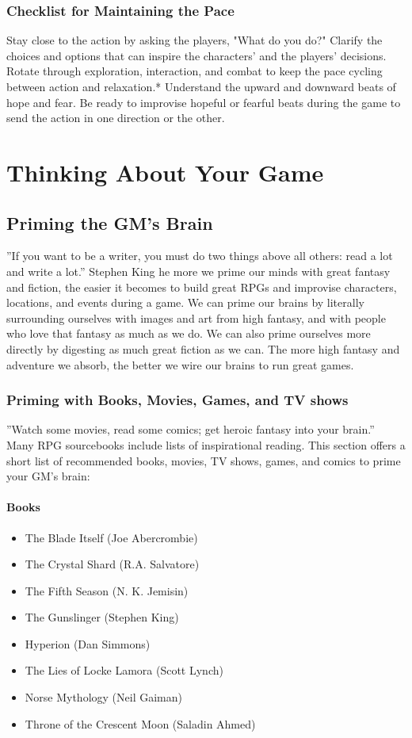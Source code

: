 \documentclass[10pt,a4paper,twoside,bg=print,twocolumn,openany,nodeprecatedcode]{dndbook}
\begin{document}
\subsection{Checklist for Maintaining the Pace}
Stay close to the action by asking the players, "What do you do?"
Clarify the choices and options that can inspire the characters' and the players' decisions.
Rotate through exploration, interaction, and combat to keep the pace cycling between action and relaxation.* Understand the upward and downward beats of hope and fear.
Be ready to improvise hopeful or fearful beats during the game to send the action in one direction or the other.
\chapter{Thinking About Your Game}
\section{Priming the GM's Brain}
\DndQuote%
{}
{''If you want to be a writer, you must do two things above all others: read a lot and write a lot.''}
{Stephen King}
he more we prime our minds with great fantasy and fiction, the easier it becomes to build great RPGs and improvise characters, locations, and events during a game. We can prime our brains by literally surrounding ourselves with images and art from high fantasy, and with people who love that fantasy as much as we do. We can also prime ourselves more directly by digesting as much great fiction as we can. The more high fantasy and adventure we absorb, the better we wire our brains to run great games.

\subsection{Priming with Books, Movies, Games, and TV shows}
\DndQuote%
{}
{''Watch some movies, read some comics; get heroic fantasy into your brain.''}
{}
Many RPG sourcebooks include lists of inspirational reading. This section offers a short list of recommended books, movies, TV shows, games, and comics to prime your GM's brain:
\subsubsection{Books}

\begin{itemize}
\item The Blade Itself (Joe Abercrombie)
\item The Crystal Shard (R.A. Salvatore)
\item The Fifth Season (N. K. Jemisin)
\item The Gunslinger (Stephen King)
\item Hyperion (Dan Simmons)
\item The Lies of Locke Lamora (Scott Lynch)
\item Norse Mythology (Neil Gaiman)
\item Throne of the Crescent Moon (Saladin Ahmed)
\end{itemize}
\end{document}
